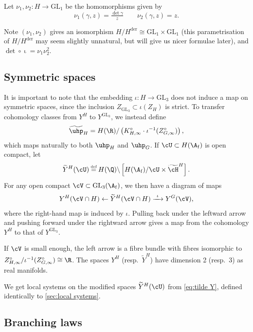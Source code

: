 \documentclass[10pt,reqno,a4paper]{amsart}
\newcommand{\subf}{_{\mathrm{f}}}
\newcommand{\GL}{\mathrm{GL}}
\begin{document}
\begin{definition}\label{def:nu}
Let $\nu_1, \nu_2: H \to \GL_1$ be the homomorphisms given by
\[ \nu_1(\gamma, z) = \tfrac{\det \gamma}{z}\qquad \nu_2(\gamma, z) = z. \]
\end{definition}

Note $(\nu_1, \nu_2)$ gives an isomorphism $H / H^{\mathrm{der}} \cong \GL_1 \times \GL_1$ (this parametrisation of $H / H^{\mathrm{der}}$ may seem slightly unnatural, but will give us nicer formulae later), and $\det \circ \mathop{\iota} = \nu_1\nu_2^2$.

\subsection{Symmetric spaces}\label{sec:symmetric space H}

It is important to note that the embedding $\iota: H \to \GL_3$ does not induce a map on symmetric spaces, since the inclusion $Z_{\GL_3} \subset \iota(Z_H)$ is strict. To transfer cohomology classes from $Y^H$ to $Y^{\GL_3}$, we instead define
\[
\widetilde{\uhp}_H = H(\R) / \left(K_{H, \infty}^{\circ} \cdot \iota^{-1}(Z_{G, \infty}^\circ)\right),
\]
which maps naturally to both $\uhp_H$ and $\uhp_G$. If $\cU \subset H(\A\subf)$ is open compact, let
\begin{equation}
\label{eq:tilde Y}
\widetilde{Y}^H(\cU) \defeq H(\Q)\backslash\left[H(\A\subf)/\cU \times \widetilde{\cH}^H\right].
\end{equation}
For any open compact $\cV \subset \GL_3(\A\subf)$, we then have a diagram of maps
\begin{equation}\label{eq:tilde maps}
Y^H(\cV \cap H) \leftarrow \widetilde{Y}^H(\cV \cap H) \xrightarrow{\ \iota\ } Y^G(\cV),
\end{equation}
where the right-hand map is induced by $\iota$. Pulling back under the leftward arrow and pushing forward under the rightward arrow gives a map from the cohomology $Y^H$ to that of $Y^{\GL_3}$.

If $\cV$ is small enough, the left arrow is a fibre bundle with fibres isomorphic to $Z_{H, \infty}^\circ / \iota^{-1}(Z_{G, \infty}^\circ) \cong \R$. The spaces $Y^H$ (resp.\ $\widetilde{Y}^H$) have dimension 2 (resp.\ 3) as real manifolds.

We get local systems on the modified spaces $\widetilde{Y}^H(\cU)$ from \eqref{eq:tilde Y}, defined identically to \cref{sec:local systems}.

\subsection{Branching laws}\label{sec:branching laws}
\end{document}

